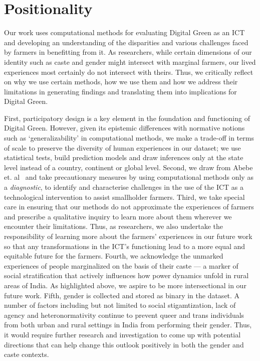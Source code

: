 \documentclass[manuscript,screen]{acmart}
\begin{document}
\section{Positionality}\label{positionality}

Our work uses computational methods for evaluating Digital Green as an ICT and developing an understanding of the disparities and various challenges faced by farmers in benefitting from it.  As researchers, while certain dimensions of our identity such as caste and gender might intersect with marginal farmers, our lived experiences most certainly do not intersect with theirs. Thus, we critically reflect on why we use certain methods, how we use them and how we address their limitations in generating findings and translating them into implications for Digital Green. 

First, participatory design is a key element in the foundation and functioning of Digital Green. However, given its epistemic differences with normative notions such as ‘generalizability’ in computational methods, we make a trade-off in terms of scale to preserve the diversity of human experiences in our dataset; we use statistical tests, build prediction models and draw inferences only at the state level instead of a country, continent or global level. Second, we draw from Abebe et. al~\cite{abebefairness} and take precautionary measures by using computational methods only as a \textit{diagnostic}, to identify and characterise challenges in the use of the ICT as a technological intervention to assist smallholder farmers. Third, we take special care in ensuring that our methods do not approximate the experiences of farmers and prescribe a qualitative inquiry to learn more about them wherever we encounter their limitations. Thus, as researchers, we also undertake the responsibility of learning more about the farmers' experiences in our future work so that any transformations in the ICT’s functioning lead to a more equal and equitable future for the farmers. Fourth, we acknowledge the unmarked experiences of people marginalized on the basis of their caste --- a marker of social stratification that actively influences how power dynamics unfold in rural areas of India. As highlighted above, we aspire to be more intersectional in our future work. Fifth, gender is collected and stored as binary in the dataset. A number of factors including but not limited to social stigamtization, lack of agency and heteronormativity continue to prevent queer and trans individuals from both urban and rural settings in India from performing their gender. Thus, it would require further research and investigation to come up with potential directions that can help change this outlook positively in both the gender and caste contexts. %
\end{document}

